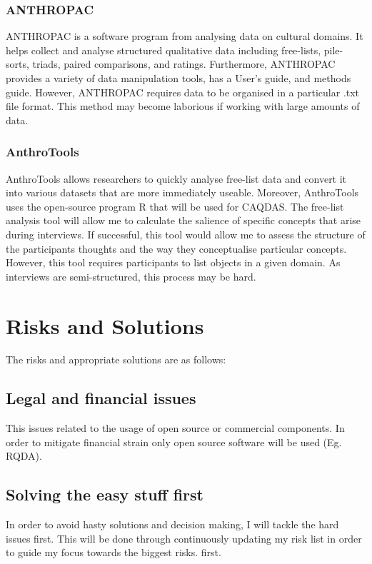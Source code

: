 \documentclass{article}
\begin{document}
\subsubsection{ANTHROPAC} 
ANTHROPAC is a software program from analysing data on cultural domains. It helps collect and analyse structured qualitative data including free-lists, pile-sorts, triads, paired comparisons, and ratings. Furthermore, ANTHROPAC provides a variety of data manipulation tools, has a User's guide, and methods guide. However, ANTHROPAC requires data to be organised in a particular .txt file format. This method may become laborious if working with large amounts of data. 

\subsubsection{AnthroTools}
AnthroTools allows researchers to quickly analyse free-list data and convert it into various datasets that are more immediately useable. Moreover, AnthroTools uses the open-source program R that will be used for CAQDAS. The free-list analysis tool will allow me to calculate the salience of specific concepts that arise during interviews. If successful, this tool would allow me to assess the structure of the participants thoughts and the way they conceptualise particular concepts. However, this tool requires participants to list objects in a given domain. As interviews are semi-structured, this process may be hard.

\section{Risks and Solutions}
The risks and appropriate solutions are as follows:

\subsection{Legal and financial issues}
This issues related to the usage of open source or commercial components. In order to mitigate financial strain only open source software will be used (Eg. RQDA).

\subsection{Solving the easy stuff first}
In order to avoid hasty solutions and decision making, I will tackle the hard issues first. This will be done through continuously updating my risk list in order to guide my focus towards the biggest risks. first. 
\end{document}
